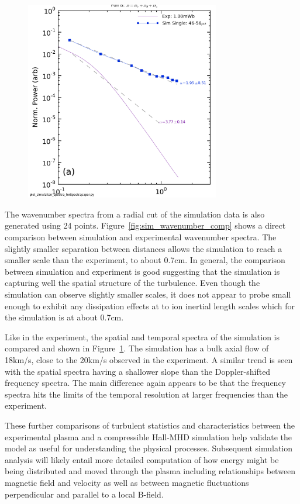 \documentclass[aip,prl,amsmath,amssymb,reprint,superscriptaddress]{revtex4-1} %
\begin{document}
\begin{figure}[!htbp]
\centerline{
\includegraphics[width=8.5cm]{Simulation_spatial_temporal_spectra_comparision}}
\caption{\label{fig:sim_spatial_comp}}
\end{figure}

The wavenumber spectra from a radial cut of the simulation data is also generated using 24 points. Figure~\ref{fig:sim_wavenumber_comp} shows a direct comparison between simulation and experimental wavenumber spectra. The slightly smaller separation between distances allows the simulation to reach a smaller scale than the experiment, to about 0.7cm. In general, the comparison between simulation and experiment is good suggesting that the simulation is capturing well the spatial structure of the turbulence. Even though the simulation can observe slightly smaller scales, it does not appear to probe small enough to exhibit any dissipation effects at to ion inertial length scales which for the simulation is at about 0.7cm.

Like in the experiment, the spatial and temporal spectra of the simulation is compared and shown in Figure~\ref{fig:sim_spatial_comp}. The simulation has a bulk axial flow of 18km/s, close to the 20km/s observed in the experiment. A similar trend is seen with the spatial spectra having a shallower slope than the Doppler-shifted frequency spectra. The main difference again appears to be that the frequency spectra hits the limits of the temporal resolution at larger frequencies than the experiment.

These further comparisons of turbulent statistics and characteristics between the experimental plasma and a compressible Hall-MHD simulation help validate the model as useful for understanding the physical processes. Subsequent simulation analysis will likely entail more detailed computation of how energy might be being distributed and moved through the plasma including relationships between magnetic field and velocity as well as between magnetic fluctuations perpendicular and parallel to a local B-field.
\end{document}
